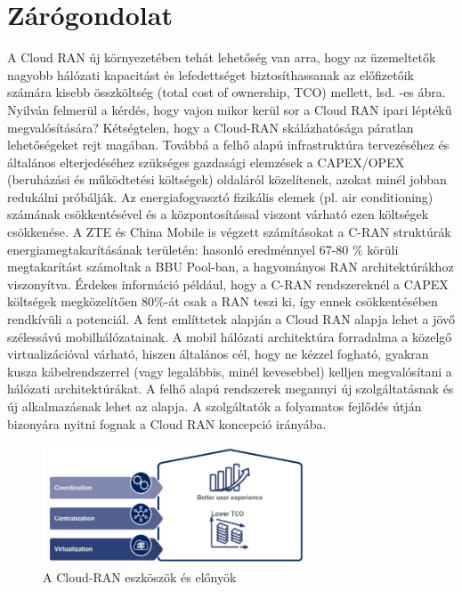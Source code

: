 \chapter{Zárógondolat}\label{sect:Ending}
A Cloud RAN új környezetében tehát lehetőség van arra, hogy az üzemeltetők nagyobb hálózati kapacitást és lefedettséget biztosíthassanak az előfizetőik számára kisebb összköltség (total cost of ownership, TCO) mellett, lsd. -es ábra. Nyilván felmerül a kérdés, hogy vajon mikor kerül sor a Cloud RAN ipari léptékű megvalósítására? Kétségtelen, hogy a Cloud-RAN skálázhatósága páratlan lehetőségeket rejt magában. Továbbá a felhő alapú infrastruktúra tervezéséhez és általános elterjedéséhez szükséges gazdasági elemzések a CAPEX/OPEX (beruházási és működtetési költségek) oldaláról közelítenek, azokat minél jobban redukálni próbálják. Az energiafogyasztó fizikális elemek (pl. air conditioning) számának csökkentésével és a központosítással viszont várható ezen költségek csökkenése. A ZTE és China Mobile is végzett számításokat a C-RAN struktúrák energiamegtakarításának területén: hasonló eredménnyel 67-80 \% körüli megtakarítást számoltak a BBU Pool-ban, a hagyományos RAN architektúrákhoz viszonyítva. Érdekes információ például, hogy a C-RAN rendszereknél a CAPEX költségek megközelítően 80\%-át csak a RAN teszi ki, így ennek csökkentésében rendkívüli a potenciál. \cite{GreenCRAN}
A fent említtetek alapján a Cloud RAN alapja lehet a jövő szélessávú mobilhálózatainak. A mobil hálózati architektúra forradalma a közelgő virtualizációval várható, hiszen általános cél, hogy ne kézzel fogható, gyakran kusza kábelrendszerrel (vagy legalábbis, minél kevesebbel) kelljen megvalósítani a hálózati architektúrákat. A felhő alapú rendszerek megannyi új szolgáltatásnak és új alkalmazásnak lehet az alapja. A szolgáltatók a folyamatos fejlődés útján bizonyára nyitni fognak a Cloud RAN koncepció irányába.
\begin{figure}[!ht]
\centering
\includegraphics[width=0.7\textwidth, keepaspectratio]{figures/cool.png}
\caption{A Cloud-RAN eszköszök és előnyök} 
\label{fig:cool}
\end{figure}
